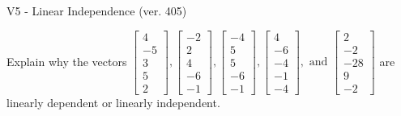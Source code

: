 \begin{exercise}
  \begin{exerciseTitle}V5 - Linear Independence (ver. 405)\end{exerciseTitle}
  \begin{exerciseStatement}
    Explain why the vectors \(\left[\begin{array}{r}
4 \\
-5 \\
3 \\
5 \\
2
\end{array}\right] , \left[\begin{array}{r}
-2 \\
2 \\
4 \\
-6 \\
-1
\end{array}\right] , \left[\begin{array}{r}
-4 \\
5 \\
5 \\
-6 \\
-1
\end{array}\right] , \left[\begin{array}{r}
4 \\
-6 \\
-4 \\
-1 \\
-4
\end{array}\right] , \text{ and } \left[\begin{array}{r}
2 \\
-2 \\
-28 \\
9 \\
-2
\end{array}\right]\) are linearly dependent or linearly independent.	



\end{exerciseStatement}
\end{exercise}
